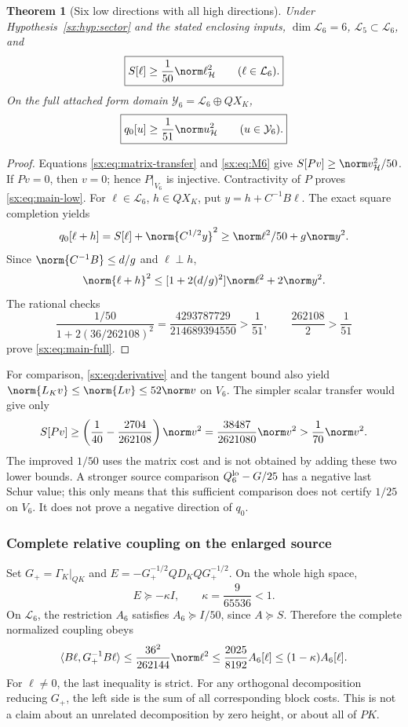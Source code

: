 \documentclass[11pt,a4paper]{article}
\numberwithin{equation}{section}
\newtheorem{theorem}{Theorem}[section]
\theoremstyle{definition}\newtheorem{definition}[theorem]{Definition}
\theoremstyle{remark}\newtheorem{remark}[theorem]{Remark}
\newcommand{\Hh}{\mathcal H}\newcommand{\Hw}{\mathcal H}
\begin{document}
\begin{theorem}[Six low directions with all high directions]\label{sx:thm:main}
Under Hypothesis~\ref{sx:hyp:sector} and the stated enclosing inputs,
$\dim\mathcal L_6=6$, $\mathcal L_5\subset\mathcal L_6$, and
\begin{equation}\label{sx:eq:main-low}
 \boxed{S[\ell]\ge\frac1{50}\norm\ell_\Hh^2\qquad(\ell\in\mathcal L_6).}
\end{equation}
On the full attached form domain $\mathcal Y_6=\mathcal L_6\oplus QX_K$,
\begin{equation}\label{sx:eq:main-full}
 \boxed{q_0[u]\ge\frac1{51}\norm u_\Hh^2\qquad(u\in\mathcal Y_6).}
\end{equation}
\end{theorem}
\begin{proof}
Equations \eqref{sx:eq:matrix-transfer} and \eqref{sx:eq:M6} give
$S[Pv]\ge\norm v_\Hh^2/50$. If $Pv=0$, then $v=0$; hence $P|_{V_6}$
is injective. Contractivity of $P$ proves \eqref{sx:eq:main-low}.
For $\ell\in\mathcal L_6$, $h\in QX_K$, put $y=h+C^{-1}B\ell$.
The exact square completion yields
\[
 q_0[\ell+h]=S[\ell]+\norm{C^{1/2}y}^2
             \ge\norm\ell^2/50+g\norm y^2.
\]
Since $\norm{C^{-1}B}\le d/g$ and $\ell\perp h$,
\[
 \norm{\ell+h}^2\le[1+2(d/g)^2]\norm\ell^2+2\norm y^2.
\]
The rational checks
\[
 \frac{1/50}{1+2(36/262108)^2}
 =\frac{4293787729}{214689394550}>\frac1{51},
 \qquad \frac{262108}{2}>\frac1{51}
\]
prove \eqref{sx:eq:main-full}.
\end{proof}

For comparison, \eqref{sx:eq:derivative} and the tangent bound also yield
$\norm{L_Kv}\le\norm{Lv}\le52\norm v$ on $V_6$. The simpler scalar
transfer would give only
\[
 S[Pv]\ge\left(\frac1{40}-\frac{2704}{262108}\right)\norm v^2
 =\frac{38487}{2621080}\norm v^2>\frac1{70}\norm v^2.
\]
The improved $1/50$ uses the matrix cost and is not obtained by adding
these two lower bounds. A stronger source comparison
$Q_6^{\rm lo}-G/25$ has a negative last Schur value; this only means
that this sufficient comparison does not certify $1/25$ on $V_6$.
It does not prove a negative direction of $q_0$.

\subsubsection*{Complete relative coupling on the enlarged source}
Set $G_+=\Gamma_K|_{QK}$ and
$E=-G_+^{-1/2}QD_KQG_+^{-1/2}$. On the whole high space,
\[
 E\succeq-\kappa I,\qquad\kappa=\frac9{65536}<1.
\]
On $\mathcal L_6$, the restriction $A_6$ satisfies $A_6\succeq I/50$, since
$A\succeq S$. Therefore the complete normalized coupling obeys
\[
 \langle B\ell,G_+^{-1}B\ell\rangle
 \le\frac{36^2}{262144}\norm\ell^2
 \le\frac{2025}{8192}A_6[\ell]
 \le(1-\kappa)A_6[\ell].
\]
For $\ell\ne0$, the last inequality is strict. For any orthogonal decomposition reducing $G_+$, the left side is the
sum of all corresponding block costs. This is not a claim about an
unrelated decomposition by zero height, or about all of $PK$.
\end{document}
